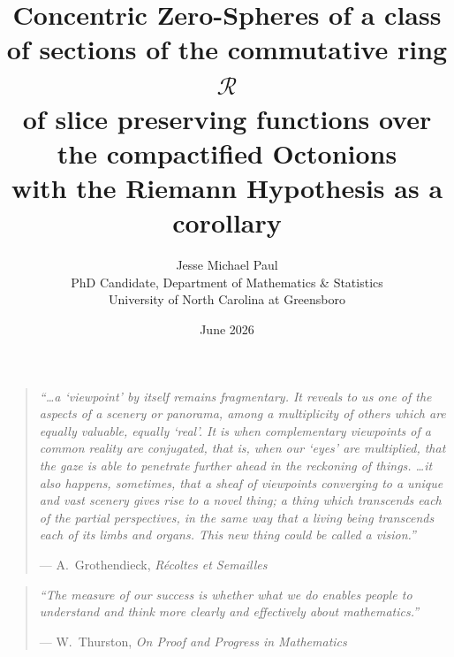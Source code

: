 \documentclass[11pt]{article}
\title{Concentric Zero-Spheres of a class of sections of the commutative ring $\mathcal R$\\ of slice preserving functions
over the compactified Octonions\\[0.4em]
\large
with the Riemann Hypothesis as a corollary}
\author{Jesse Michael Paul\\[2pt]
{\normalsize PhD Candidate, Department of Mathematics \& Statistics}\\
{\normalsize University of North Carolina at Greensboro}}
\date{June 2026}
\theoremstyle{plain}
\theoremstyle{definition}
\theoremstyle{remark}
\begin{document}
\maketitle

\begin{quote}\small\itshape
``\dots a `viewpoint' by itself remains fragmentary. It reveals to us one of the aspects of a
scenery or panorama, among a multiplicity of others which are equally valuable, equally `real'.
It is when complementary viewpoints of a common reality are conjugated, that is, when our `eyes'
are multiplied, that the gaze is able to penetrate further ahead in the reckoning of things.
\dots it also happens, sometimes, that a sheaf of viewpoints converging to a unique and vast
scenery gives rise to a novel thing; a thing which transcends each of the partial perspectives,
in the same way that a living being transcends each of its limbs and organs. This new thing could
be called a vision.''
\begin{flushright}\upshape --- A.\ Grothendieck, \emph{R\'ecoltes et Semailles}\end{flushright}
\end{quote}

\begin{quote}\small\itshape
``The measure of our success is whether what we do enables people to understand and think
more clearly and effectively about mathematics.''
\begin{flushright}\upshape --- W.\ Thurston, \emph{On Proof and Progress in Mathematics}\end{flushright}
\end{quote}
\end{document}
